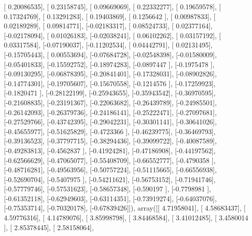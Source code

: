 \documentclass{article}
\begin{document}
       [ 0.20086535],
       [ 0.23158745],
       [ 0.09669069],
       [ 0.22332277],
       [ 0.19659578],
       [ 0.17324769],
       [ 0.13291283],
       [ 0.19403869],
       [ 0.1256642 ],
       [ 0.00987833],
       [ 0.02189289],
       [ 0.09814771],
       [-0.02183317],
       [ 0.08524733],
       [ 0.02377164],
       [-0.02178094],
       [ 0.01026183],
       [-0.02038241],
       [ 0.06102262],
       [ 0.03157192],
       [ 0.03317584],
       [-0.07190037],
       [-0.11202534],
       [ 0.04442791],
       [ 0.02131495],
       [-0.15705443],
       [ 0.00553694],
       [-0.07684728],
       [-0.02548398],
       [-0.01580009],
       [-0.05401833],
       [-0.15592752],
       [-0.18974283],
       [-0.0897447 ],
       [-0.1975478 ],
       [-0.09130295],
       [-0.06878395],
       [-0.20841401],
       [-0.17328031],
       [-0.08902826],
       [-0.14774301],
       [-0.19705607],
       [-0.15670558],
       [-0.1214576 ],
       [-0.17259923],
       [-0.1820471 ],
       [-0.28122199],
       [-0.25943655],
       [-0.35943542],
       [-0.36970595],
       [-0.21608835],
       [-0.23191367],
       [-0.22063682],
       [-0.26439789],
       [-0.24985501],
       [-0.26142093],
       [-0.26379736],
       [-0.24186141],
       [-0.25222471],
       [-0.27097681],
       [-0.27529766],
       [-0.43742395],
       [-0.29042231],
       [-0.30301141],
       [-0.30641026],
       [-0.45655977],
       [-0.51625829],
       [-0.4723366 ],
       [-0.46239775],
       [-0.36469793],
       [-0.39136523],
       [-0.37797715],
       [-0.38294436],
       [-0.39099722],
       [-0.40087589],
       [-0.49283813],
       [-0.4562837 ],
       [-0.41924281],
       [-0.47186908],
       [-0.44197562],
       [-0.62566629],
       [-0.47065077],
       [-0.55408709],
       [-0.66552777],
       [-0.4790358 ],
       [-0.48716281],
       [-0.49563956],
       [-0.50757224],
       [-0.51115665],
       [-0.66556938],
       [-0.52690704],
       [-0.5407975 ],
       [-0.54211621],
       [-0.56753152],
       [-0.71941746],
       [-0.57779746],
       [-0.57531623],
       [-0.58657348],
       [-0.590197  ],
       [-0.7798981 ],
       [-0.61352118],
       [-0.62949603],
       [-0.63114351],
       [-0.73919274],
       [-0.64037076],
       [-0.75353714],
       [-0.70320178],
       [-0.67839426]]), array([[  4.71958041],
       [  4.58683437],
       [  4.59776316],
       [  4.14789076],
       [  3.85998798],
       [  3.84468584],
       [  3.41012485],
       [  3.4580014 ],
       [  2.85378445],
       [  2.58158064],
\end{document}
